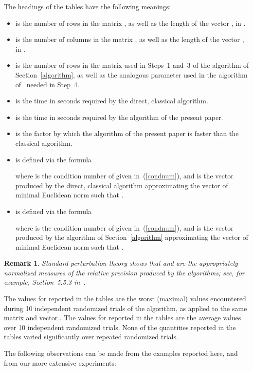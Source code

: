 \documentclass[letterpaper,12pt]{article}
\newtheorem{remark1}[theorem]{Remark}
\newenvironment{remark}{\begin{remark1} \rm}{\end{remark1}}
\begin{document}
The headings of the tables have the following meanings:
\begin{itemize}
\item  is the number of rows in the matrix ,
      as well as the length of the vector ,
      in .
\item  is the number of columns in the matrix ,
      as well as the length of the vector ,
      in .
\item  is the number of rows in the matrix  used
      in Steps~1 and~3 of the algorithm of Section~\ref{algorithm},
      as well as the analogous parameter used in the algorithm
      of~\cite{rokhlin-tygert} needed in Step~4.
\item  is the time in seconds required
      by the direct, classical algorithm.
\item  is the time in seconds required
      by the algorithm of the present paper.
\item  is the factor by which
      the algorithm of the present paper
      is faster than the classical algorithm.
\item  is defined via the formula

where  is the condition number of  given
in~(\ref{condnum}), and  is the vector
produced by the direct, classical algorithm
approximating the vector  of minimal Euclidean norm
such that .
\item  is defined via the formula

where  is the condition number of  given
in~(\ref{condnum}), and  is the vector
produced by the algorithm of Section~\ref{algorithm}
approximating the vector  of minimal Euclidean norm
such that .
\end{itemize}

\begin{remark}
Standard perturbation theory shows that
 and  are the appropriately normalized measures
of the relative precision produced by the algorithms;
see, for example, Section~5.5.3 in~\cite{dahlquist-bjorck}.
\end{remark}

The values for  reported in the tables are
the worst (maximal) values encountered during 10 independent randomized trials
of the algorithm, as applied to the same matrix 
and vector .
The values for  reported in the tables are the average values
over 10 independent randomized trials.
None of the quantities reported in the tables varied significantly
over repeated randomized trials.

The following observations can be made from the examples reported here,
and from our more extensive experiments:
\end{document}
